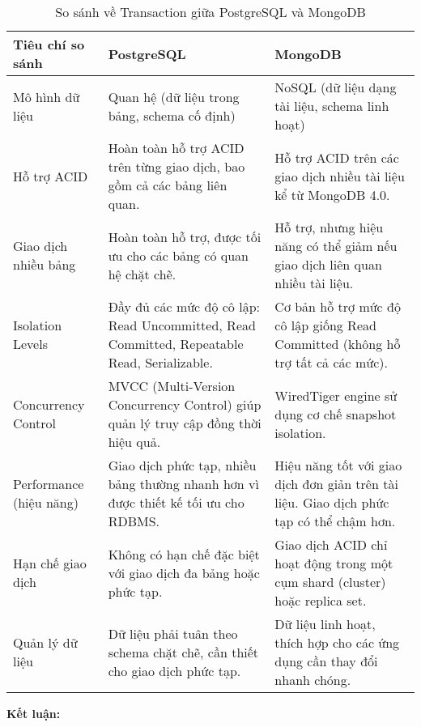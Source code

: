 \begin{table}[H]
    \centering
    \begin{tabular}{|L{3.2cm}|L{5.05cm}|L{5.05cm}|} \hline 
         \textbf{Tiêu chí so sánh }&  \textbf{PostgreSQL}&  \textbf{MongoDB}\\ \hline 
         Mô hình dữ liệu & Quan hệ (dữ liệu trong bảng, schema cố định) & NoSQL (dữ liệu dạng tài liệu, schema linh hoạt)\\ \hline 
         Hỗ trợ ACID & Hoàn toàn hỗ trợ ACID trên từng giao dịch, bao gồm cả các bảng liên quan. & Hỗ trợ ACID trên các giao dịch nhiều tài liệu kể từ MongoDB 4.0.\\ \hline
         Giao dịch nhiều bảng & Hoàn toàn hỗ trợ, được tối ưu cho các bảng có quan hệ chặt chẽ. & Hỗ trợ, nhưng hiệu năng có thể giảm nếu giao dịch liên quan nhiều tài liệu.\\ \hline
         Isolation Levels & Đầy đủ các mức độ cô lập: Read Uncommitted, Read Committed, Repeatable Read, Serializable. & Cơ bản hỗ trợ mức độ cô lập giống Read Committed (không hỗ trợ tất cả các mức).\\ \hline
         Concurrency Control & MVCC (Multi-Version Concurrency Control) giúp quản lý truy cập đồng thời hiệu quả. & WiredTiger engine sử dụng cơ chế snapshot isolation.\\ \hline
         Performance (hiệu năng) & Giao dịch phức tạp, nhiều bảng thường nhanh hơn vì được thiết kế tối ưu cho RDBMS. & Hiệu năng tốt với giao dịch đơn giản trên tài liệu. Giao dịch phức tạp có thể chậm hơn.\\ \hline
         Hạn chế giao dịch & Không có hạn chế đặc biệt với giao dịch đa bảng hoặc phức tạp. & Giao dịch ACID chỉ hoạt động trong một cụm shard (cluster) hoặc replica set.\\ \hline
         Quản lý dữ liệu & Dữ liệu phải tuân theo schema chặt chẽ, cần thiết cho giao dịch phức tạp. & Dữ liệu linh hoạt, thích hợp cho các ứng dụng cần thay đổi nhanh chóng.\\ \hline
    \end{tabular}
    \caption{So sánh về Transaction giữa PostgreSQL và MongoDB}
    \label{tab:transaction}
\end{table}
\indent \textbf{Kết luận:}
\newpage